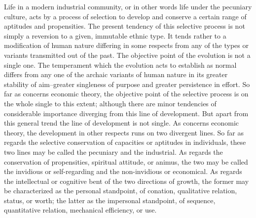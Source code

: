 \documentclass[12pt]{report}
\begin{document}
Life in a modern industrial community, or in other words life under
the pecuniary culture, acts by a process of selection to develop and
conserve a certain range of aptitudes and propensities. The present
tendency of this selective process is not simply a reversion to a given,
immutable ethnic type. It tends rather to a modification of human nature
differing in some respects from any of the types or variants transmitted
out of the past. The objective point of the evolution is not a single
one. The temperament which the evolution acts to establish as normal
differs from any one of the archaic variants of human nature in its
greater stability of aim--greater singleness of purpose and greater
persistence in effort. So far as concerns economic theory, the objective
point of the selective process is on the whole single to this extent;
although there are minor tendencies of considerable importance diverging
from this line of development. But apart from this general trend the
line of development is not single. As concerns economic theory, the
development in other respects runs on two divergent lines. So far
as regards the selective conservation of capacities or aptitudes
in individuals, these two lines may be called the pecuniary and the
industrial. As regards the conservation of propensities, spiritual
attitude, or animus, the two may be called the invidious or
self-regarding and the non-invidious or economical. As regards the
intellectual or cognitive bent of the two directions of growth, the
former may be characterized as the personal standpoint, of conation,
qualitative relation, status, or worth; the latter as the impersonal
standpoint, of sequence, quantitative relation, mechanical efficiency,
or use.
\end{document}
